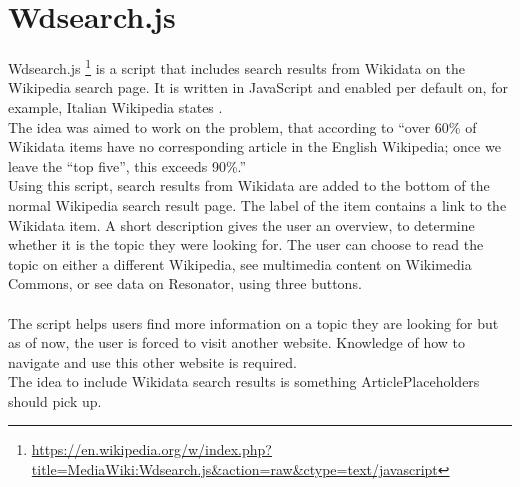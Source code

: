\section{Wdsearch.js}
Wdsearch.js \footnote{\url{https://en.wikipedia.org/w/index.php?title=MediaWiki:Wdsearch.js&action=raw&ctype=text/javascript}} is a script that includes search results from Wikidata on the Wikipedia search page. It is written in JavaScript and enabled per default on, for example, Italian Wikipedia states \citet{gerardm:01}. \\
The idea was aimed to work on the problem, that according to \citet{manske:01} ``over 60\% of Wikidata items have no corresponding article in the English Wikipedia; once we leave the “top five”, this exceeds 90\%.'' \\
Using this script, search results from Wikidata are added to the bottom of the normal Wikipedia search result page. The label of the item contains a link to the Wikidata item. A short description gives the user an overview, to determine whether it is the topic they were looking for. The user can choose to read the topic on either a different Wikipedia, see multimedia content on Wikimedia Commons, or see data on Resonator, using three buttons. \\
\\
The script helps users find more information on a topic they are looking for but as of now, the user is forced to visit another website. Knowledge of how to navigate and use this other website is required. \\
The idea to include Wikidata search results is something ArticlePlaceholders should pick up.